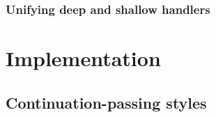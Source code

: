\documentclass[12pt,phd,lfcs,twoside,openright,logo,leftchapter,normalheadings]{infthesis}
\theoremstyle{plain}
\theoremstyle{definition}
\begin{document}
\section{Unifying deep and shallow handlers}

\part{Implementation}

\chapter{Continuation-passing styles}
\label{ch:cps}
\end{document}
